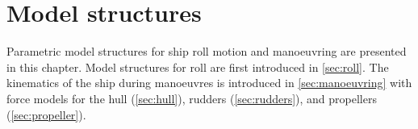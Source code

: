 \chapter{Model structures}
\label{ch:models}
\noindent Parametric model structures for ship roll motion and manoeuvring are presented in this chapter. Model structures for roll are first introduced in \autoref{sec:roll}. 
The kinematics of the ship during manoeuvres is introduced in \autoref{sec:manoeuvring} with force models for the hull (\autoref{sec:hull}), rudders (\autoref{sec:rudders}), and propellers (\autoref{sec:propeller}).






%
%
%